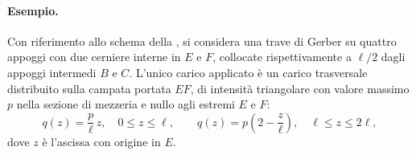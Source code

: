 \paragraph{Esempio.}
\label{par:esempio_gerber}

Con riferimento allo schema della ,
si considera una trave di Gerber su quattro appoggi con due cerniere
interne in $E$ e $F$, collocate rispettivamente a $\ell/2$ dagli
appoggi intermedi $B$ e $C$.  L'unico carico applicato è un
carico trasversale distribuito sulla campata portata $EF$, di
intensità triangolare con valore massimo $p$ nella sezione di
mezzeria e nullo agli estremi $E$ e $F$:
\[
q(z) = \frac{p}{\ell}\,z, \quad 0 \le z \le \ell,
\qquad
q(z) = p\!\left(2 - \frac{z}{\ell}\right), \quad \ell \le z \le 2\ell,
\]
dove $z$ è l'ascissa con origine in $E$.


